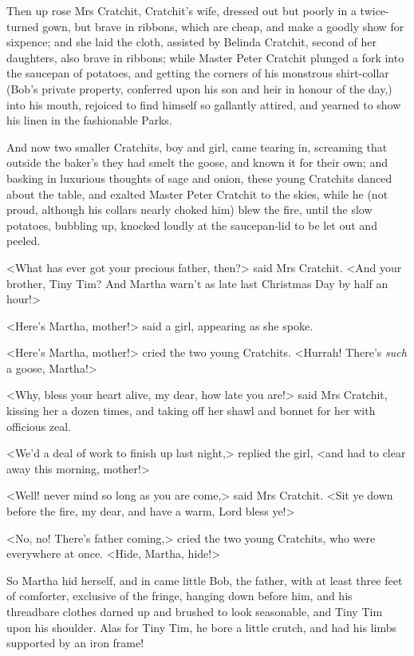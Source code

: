 Then up rose Mrs Cratchit, Cratchit's wife, dressed out but poorly in a
twice-turned gown, but brave in ribbons, which are cheap, and make a goodly show
for sixpence; and she laid the cloth, assisted by Belinda Cratchit, second of
her daughters, also brave in ribbons; while Master Peter Cratchit plunged a fork
into the sauce\-pan of potatoes, and getting the corners of his monstrous
shirt-collar (Bob's private property, conferred upon his son and heir in honour
of the day,) into his mouth, rejoiced to find himself so gallantly attired, and
yearned to show his linen in the fashionable Parks.

And now two smaller Cratchits, boy and girl, came tearing in, screaming that
outside the baker's they had smelt the goose, and known it for their own; and
basking in luxurious thoughts of sage and onion, these young Cratchits danced
about the table, and exalted Master Peter Cratchit to the skies, while he (not
proud, although his collars nearly choked him) blew the fire, until the slow
potatoes, bubbling up, knocked loudly at the saucepan-lid to be let out and
peeled.

<What has ever got your precious father, then?> said Mrs Cratchit. <And your
brother, Tiny Tim? And Martha warn't as late last Christmas Day by half an
hour!>

<Here's Martha, mother!> said a girl, appearing as she spoke.

<Here's Martha, mother!> cried the two young Cratchits. <Hurrah! There's
\emph{such} a goose, Martha!>

<Why, bless your heart alive, my dear, how late you are!> said Mrs Cratchit,
kissing her a dozen times, and taking off her shawl and bonnet for her with
officious zeal.

<We'd a deal of work to finish up last night,> replied the girl, <and had to
clear away this morning, mother!>

<Well! never mind so long as you are come,> said Mrs Cratchit. <Sit ye down
before the fire, my dear, and have a warm, Lord bless ye!>

<No, no! There's father coming,> cried the two young Cratchits, who were
everywhere at once. <Hide, Martha, hide!>

So Martha hid herself, and in came little Bob, the father, with at least three
feet of comforter, exclusive of the fringe, hanging down before him, and his
threadbare clothes darned up and brushed to look seasonable, and Tiny Tim upon
his shoulder. Alas for Tiny Tim, he bore a little crutch, and had his limbs
supported by an iron frame!


